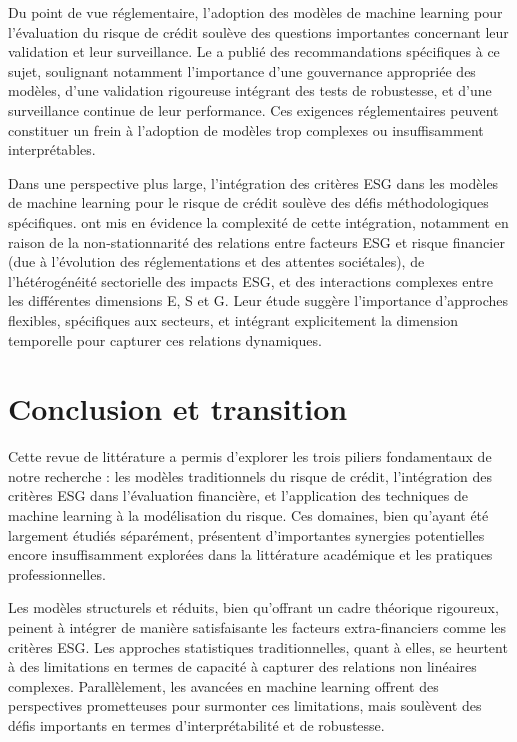Du point de vue réglementaire, l'adoption des modèles de machine learning pour l'évaluation du risque de crédit soulève des questions importantes concernant leur validation et leur surveillance. Le \citet{comite2018} a publié des recommandations spécifiques à ce sujet, soulignant notamment l'importance d'une gouvernance appropriée des modèles, d'une validation rigoureuse intégrant des tests de robustesse, et d'une surveillance continue de leur performance. Ces exigences réglementaires peuvent constituer un frein à l'adoption de modèles trop complexes ou insuffisamment interprétables.

Dans une perspective plus large, l'intégration des critères ESG dans les modèles de machine learning pour le risque de crédit soulève des défis méthodologiques spécifiques. \citet{bolton2021} ont mis en évidence la complexité de cette intégration, notamment en raison de la non-stationnarité des relations entre facteurs ESG et risque financier (due à l'évolution des réglementations et des attentes sociétales), de l'hétérogénéité sectorielle des impacts ESG, et des interactions complexes entre les différentes dimensions E, S et G. Leur étude suggère l'importance d'approches flexibles, spécifiques aux secteurs, et intégrant explicitement la dimension temporelle pour capturer ces relations dynamiques.

\section{Conclusion et transition}

Cette revue de littérature a permis d'explorer les trois piliers fondamentaux de notre recherche : les modèles traditionnels du risque de crédit, l'intégration des critères ESG dans l'évaluation financière, et l'application des techniques de machine learning à la modélisation du risque. Ces domaines, bien qu'ayant été largement étudiés séparément, présentent d'importantes synergies potentielles encore insuffisamment explorées dans la littérature académique et les pratiques professionnelles.

Les modèles structurels et réduits, bien qu'offrant un cadre théorique rigoureux, peinent à intégrer de manière satisfaisante les facteurs extra-financiers comme les critères ESG. Les approches statistiques traditionnelles, quant à elles, se heurtent à des limitations en termes de capacité à capturer des relations non linéaires complexes. Parallèlement, les avancées en machine learning offrent des perspectives prometteuses pour surmonter ces limitations, mais soulèvent des défis importants en termes d'interprétabilité et de robustesse.

